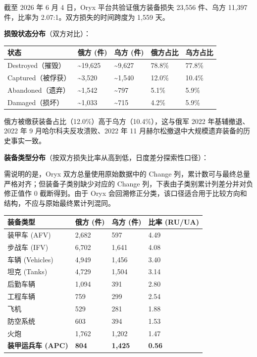 \documentclass[
  a4paper,
  fontset=none,
]{ctexart}
\begin{document}
截至 2026 年 6 月 4 日，Oryx 平台共验证俄方装备损失 23,556 件、乌方
11,397 件，比率为 2.07:1。双方损失的时间跨度为 1,559 天。

\textbf{损毁状态分布}（双方对比）：

\begin{longtable}[]{@{}lllll@{}}
\toprule
状态 & 俄方 (件) & 乌方 (件) & 俄方占比 & 乌方占比 \\
\midrule
\endhead
Destroyed（摧毁） & \textasciitilde19,625 & \textasciitilde9,627 &
78.8\% & 77.8\% \\
Captured（被俘获） & \textasciitilde3,520 & \textasciitilde1,540 &
12.0\% & 10.4\% \\
Abandoned（遗弃） & \textasciitilde1,542 & \textasciitilde797 & 5.1\% &
5.9\% \\
Damaged（损坏） & \textasciitilde1,033 & \textasciitilde715 & 4.2\% &
5.9\% \\
\bottomrule
\end{longtable}

俄方被缴获装备占比（12.0\%）高于乌方（10.4\%），这与俄军 2022
年基辅撤退、2022 年 9 月哈尔科夫反攻溃败、2022 年 11
月赫尔松撤退中大规模遗弃装备的历史事实一致。

\textbf{装备类型分布}（按双方损失比率从高到低，日度差分探索性口径）：

需说明的是，Oryx 双方总量使用原始数据中的 Change
列，累计数可与最终总量严格对齐；但装备子类别缺少对应的 Change
列，下表由子类别累计列差分并对负修正值作 0 截断得到。由于 Oryx
会回溯修正分类，该口径适合用于比较方向和结构，不应与原始最终累计列混同。

\begin{longtable}[]{@{}llll@{}}
\toprule
装备类型 & 俄方 (件) & 乌方 (件) & 比率 (RU/UA) \\
\midrule
\endhead
装甲车 (AFV) & 2,682 & 597 & 4.49 \\
步战车 (IFV) & 6,702 & 1,641 & 4.08 \\
车辆 (Vehicles) & 4,949 & 1,456 & 3.40 \\
坦克 (Tanks) & 4,729 & 1,504 & 3.14 \\
后勤车辆 & 1,094 & 391 & 2.80 \\
工程车辆 & 759 & 299 & 2.54 \\
飞机 & 529 & 281 & 1.88 \\
防空系统 & 603 & 394 & 1.53 \\
火炮 & 1,762 & 1,202 & 1.47 \\
\textbf{装甲运兵车 (APC)} & \textbf{804} & \textbf{1,425} &
\textbf{0.56} \\
\bottomrule
\end{longtable}
\end{document}
